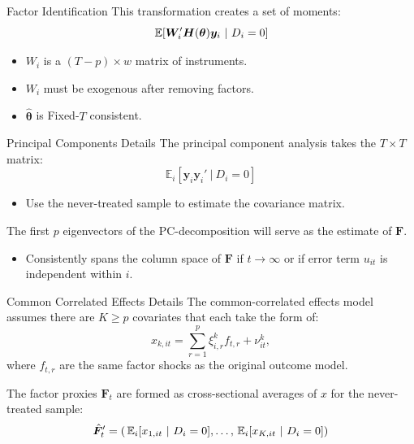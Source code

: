 \documentclass[aspectratio=43,t,11pt]{beamer}
\begin{document}
\begin{frame}{Factor Identification}
  This transformation creates a set of moments:
  $$
    \expec{\bm{W}_i' \bm{H}(\bm{\theta}) \bm{y}_i}{D_i = 0}
  $$

  \begin{itemize}
    \item $W_i$ is a $(T - p) \times w$ matrix of instruments.
    \item $W_i$ must be exogenous after removing factors.
    \item $\hat{\bm{\theta}}$ is Fixed-$T$ consistent.
  \end{itemize}

\end{frame}

\begin{frame}{Principal Components Details}\label{slide:pc_details}
  The principal component analysis takes the $T \times T$ matrix:
  $$
    \mathbb{E}_i \left[ \bm{y}_i \bm{y}_i' \ \vert \ D_i = 0\right]
  $$
  \begin{itemize}
    \item Use the never-treated sample to estimate the covariance matrix.
  \end{itemize}

  \bigskip
  The first $p$ eigenvectors of the PC-decomposition will serve as the estimate of $\bm{F}$.
  \begin{itemize}
    \item Consistently spans the column space of $\bm{F}$ if $t \to \infty$ or if error term $u_{it}$ is independent within $i$.
  \end{itemize}
\end{frame}

\begin{frame}{Common Correlated Effects Details}\label{slide:cce_details}
  The common-correlated effects model assumes there are $K \geq p$ covariates that each take the form of:
  $$
    x_{k,it} = \sum_{r = 1}^p \xi^k_{i,r} f_{t, r} + \nu^k_{it},
  $$
  where $f_{t,r}$ are the same factor shocks as the original outcome model. 

  \medskip
  The factor proxies $\bm{F}_t$ are formed as cross-sectional averages of $x$ for the never-treated sample:
  $$
    \hat{\bm{F}}_t' = \left( \expec[i]{x_{1,it}}{D_i = 0}, \dots, \expec[i]{x_{K,it}}{D_i = 0} \right)
  $$
\end{frame}
\end{document}

